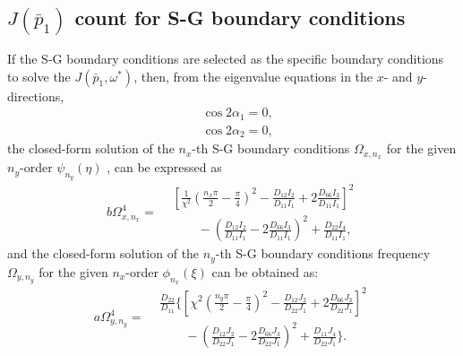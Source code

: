 \documentclass[preprint,12pt,number]{elsarticle}
\begin{document}
\begin{appendices}
\section{$J(\bar{p}_1)$ count for S-G boundary conditions}\label{sec:appendB}
If the S-G boundary conditions are selected as the specific boundary conditions to solve the $J(\bar{p}_1, \omega^*)$, then, from the eigenvalue equations in the $x$- and $y$-directions,
%
\begin{subequations}\label{eq:SGx} 
	\begin{align}
		&\cos 2\alpha_1 = 0,\\
		&\cos 2\alpha_2 = 0,
	\end{align}
\end{subequations}
%
the closed-form solution of the $n_x$-th S-G boundary conditions $\Omega_{x,n_x}$ for the given $n_y$-order $\psi_{n_y}(\eta)$ , can be expressed as
%
\begin{equation}\label{eq:J_simpx2}
	b \Omega^4_{x,n_x} =
	\begin{aligned}
		&\left[\frac{1}{\chi^2}\left(\frac{n_x\pi}{2}-\frac{\pi}{4}\right)^2 - \frac{D_{12}I_2}{D_{11}I_1} + 2 \frac{D_{66}I_3}{D_{11}I_1}\right]^2 \\
		&\qquad- \left(\frac{D_{12}I_2}{D_{11}I_1} - 2 \frac{D_{66}I_3}{D_{11}I_1}\right)^2
		+ \frac{D_{22}I_4}{D_{11}I_1},
	\end{aligned}
\end{equation}
%
and the closed-form solution of the $n_y$-th S-G boundary conditions frequency $\Omega_{y,n_y}$ for the given $n_x$-order $\phi_{n_x}(\xi)$ can be obtained as:
%
\begin{equation}\label{eq:J_simpy2}
	a\Omega^4_{y,n_y}= 
	\begin{aligned}
		&\frac{D_{22}}{D_{11}}\Biggl\{\left[\chi^2\left(\frac{n_y\pi}{2}-\frac{\pi}{4}\right)^2 - \frac{D_{12}J_2}{D_{22}J_1} + 2 \frac{D_{66}J_3}{D_{22}J_1}\right]^2 \\ 
		&\qquad - \left(\frac{D_{12}J_2}{D_{22}J_1} - 2 \frac{D_{66}J_3}{D_{22}J_1}\right)^2
		+ \frac{D_{11}J_4}{D_{22}J_1}\Biggr\}.
	\end{aligned}
\end{equation}
\end{appendices}
\FloatBarrier
%


\end{document}
